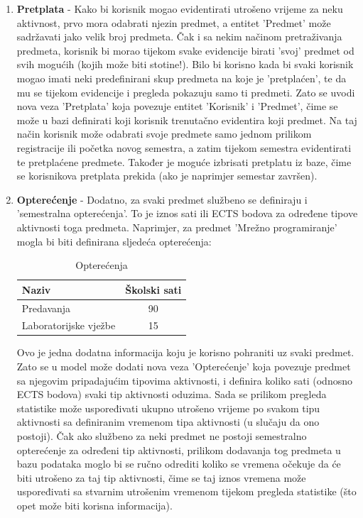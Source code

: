 \documentclass[times, utf8, zavrsni]{fer}
\begin{document}
\begin{enumerate}[leftmargin=*]
\item \textbf{Pretplata} - 
Kako bi korisnik mogao evidentirati utrošeno vrijeme za neku aktivnost, prvo mora odabrati njezin predmet, a entitet 'Predmet' može sadržavati jako velik broj predmeta. Čak i sa nekim načinom pretraživanja predmeta, korisnik bi morao tijekom svake evidencije birati 'svoj' predmet od svih mogućih (kojih može biti stotine!). Bilo bi korisno kada bi svaki korisnik mogao imati neki predefinirani skup predmeta na koje je 'pretplaćen', te da mu se tijekom evidencije i pregleda pokazuju samo ti predmeti. Zato se uvodi nova veza 'Pretplata' koja povezuje entitet 'Korisnik' i 'Predmet', čime se može u bazi definirati koji korisnik trenutačno evidentira koji predmet. Na taj način korisnik može odabrati svoje predmete samo jednom prilikom registracije ili početka novog semestra, a zatim tijekom semestra evidentirati te pretplaćene predmete. Također je moguće izbrisati pretplatu iz baze, čime se korisnikova pretplata prekida (ako je naprimjer semestar završen).\clearpage

\item \textbf{Opterećenje} - 
Dodatno, za svaki predmet službeno se definiraju i 'semestralna opterećenja'. To je iznos sati ili ECTS bodova za određene tipove aktivnosti toga predmeta. Naprimjer, za predmet 'Mrežno programiranje' mogla bi biti definirana sljedeća opterećenja:

\begin{table}[H]
\caption{Opterećenja}
\label{tbl:opterecenja}
\centering
\begin{tabular}{lc} \hline
Naziv & Školski sati\\ \hline
Predavanja & 90 \\
Laboratorijske vježbe & 15 \\ \hline
\end{tabular}
\end{table}

Ovo je jedna dodatna informacija koju je korisno pohraniti uz svaki predmet. Zato se u model može dodati nova veza 'Opterećenje' koja povezuje predmet sa njegovim pripadajućim tipovima aktivnosti, i definira koliko sati (odnosno ECTS bodova) svaki tip aktivnosti oduzima. Sada se prilikom pregleda statistike može uspoređivati ukupno utrošeno vrijeme po svakom tipu aktivnosti sa definiranim vremenom tipa aktivnosti (u slučaju da ono postoji). Čak ako službeno za neki predmet ne postoji semestralno opterećenje za određeni tip aktivnosti, prilikom dodavanja tog predmeta u bazu podataka moglo bi se ručno odrediti koliko se vremena očekuje da će biti utrošeno za taj tip aktivnosti, čime se taj iznos vremena može uspoređivati sa stvarnim utrošenim vremenom tijekom pregleda statistike (što opet može biti korisna informacija).
\end{enumerate}
\end{document}
